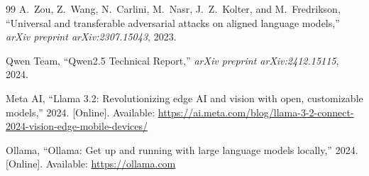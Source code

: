 \documentclass[11pt]{article}
\begin{document}
\begin{thebibliography}{99}
A.~Zou, Z.~Wang, N.~Carlini, M.~Nasr, J.~Z.~Kolter, and M.~Fredrikson,
``Universal and transferable adversarial attacks on aligned language
models,'' \emph{arXiv preprint arXiv:2307.15043}, 2023.

Qwen Team,
``Qwen2.5 Technical Report,'' \emph{arXiv preprint arXiv:2412.15115}, 2024.

Meta AI,
``Llama 3.2: Revolutionizing edge AI and vision with open, customizable
models,'' 2024. [Online]. Available:
\url{https://ai.meta.com/blog/llama-3-2-connect-2024-vision-edge-mobile-devices/}

Ollama,
``Ollama: Get up and running with large language models locally,'' 2024.
[Online]. Available: \url{https://ollama.com}

\end{thebibliography}
\end{document}
